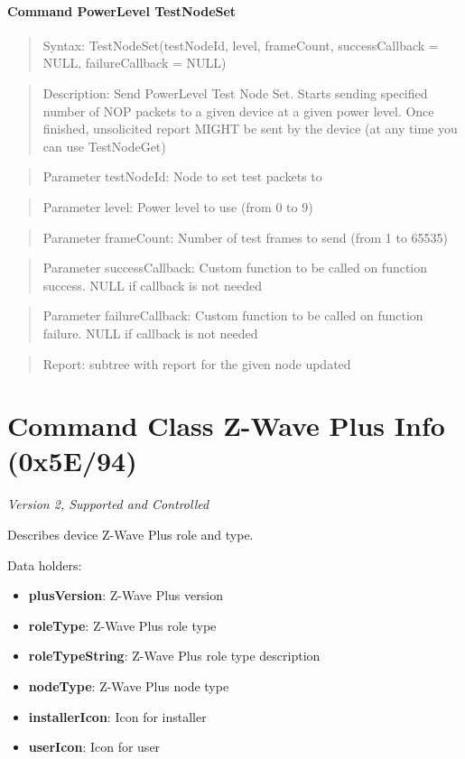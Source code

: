 \paragraph{Command PowerLevel TestNodeSet}
\begin{quote}Syntax: TestNodeSet(testNodeId, level, frameCount, successCallback = NULL, failureCallback = NULL)\end{quote}
\begin{quote}Description: Send PowerLevel Test Node Set. Starts sending specified number of NOP packets to a given device at a given power level. Once finished, unsolicited report MIGHT be sent by the device (at any time you can use TestNodeGet)\end{quote}
\begin{quote}Parameter testNodeId: Node to set test packets to\end{quote}
\begin{quote}Parameter level: Power level to use (from 0 to 9)\end{quote}
\begin{quote}Parameter frameCount: Number of test frames to send (from 1 to 65535)\end{quote}
\begin{quote}Parameter successCallback: Custom function to be called on function success. NULL if callback is not needed\end{quote}
\begin{quote}Parameter failureCallback: Custom function to be called on function failure. NULL if callback is not needed\end{quote}
\begin{quote}Report: subtree with report for the given node updated\end{quote}


\section{Command Class Z-Wave Plus Info (0x5E/94)}

\textit{Version 2, Supported and Controlled}
\newline

Describes device Z-Wave Plus role and type.
\newline

\noindent
Data holders:

\begin{itemize}
\item \textbf{plusVersion}: Z-Wave Plus version
\item \textbf{roleType}: Z-Wave Plus role type
\item \textbf{roleTypeString}: Z-Wave Plus role type description
\item \textbf{nodeType}: Z-Wave Plus node type
\item \textbf{installerIcon}: Icon for installer
\item \textbf{userIcon}: Icon for user
\end{itemize}

